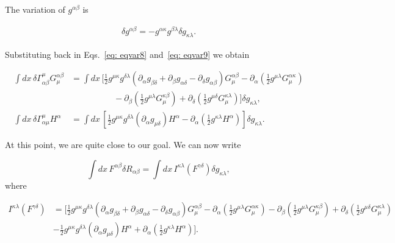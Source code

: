 \documentclass[aps,preprintnumbers,superscriptaddress,longbibliography]{revtex4-1}
\begin{document}
The variation of $g^{\alpha \beta}$ is

\begin{eqnarray}
\delta g^{\alpha \beta}=-g^{\alpha \kappa}g^{\beta \lambda}\delta g_{\kappa \lambda}.
\end{eqnarray}


Substituting back in Eqs.~\eqref{eq: eqvar8} and~\eqref{eq: eqvar9}  we obtain

\begin{align}
\int dx\, \delta \Gamma^{\mu}_{\alpha \beta}G^{\alpha \beta}_{\mu} &=\int dx\, \bigg[\frac{1}{2}g^{\mu \kappa} g^{\delta \lambda}(\partial_{\alpha}g_{\beta \delta}+\partial_{\beta}g_{\alpha \delta}-\partial_{\delta}g_{\alpha \beta})G^{\alpha \beta}_{\mu}-\partial_{\alpha}\left(\frac{1}{2} g^{\mu \lambda}G^{\alpha \kappa}_{\mu}\right) \nonumber\\
&\quad\quad\quad\quad\quad -\partial_{\beta}\left(\frac{1}{2} g^{\mu \lambda}G^{\kappa \beta}_{\mu}\right)  +\partial_{\delta}\left(\frac{1}{2} g^{\mu \delta}G^{\kappa \lambda}_{\mu}\right)\bigg] \delta g_{\kappa \lambda},\\
\int  dx\, \delta \Gamma^{\mu}_{\alpha \mu}H^{\alpha}&=\int dx\, \left[\frac{1}{2}g^{\mu \kappa} g^{\delta \lambda}(\partial_{\alpha}g_{\mu \delta})H^{\alpha}-\partial_{\alpha}\left(\frac{1}{2} g^{\kappa \lambda}H^{\alpha}\right)\right] \delta g_{\kappa \lambda}.
\end{align}


At this point, we are quite close to our goal. We can now write

\begin{equation}
\int  dx\, F^{\alpha \beta} \delta R_{\alpha \beta}= \int  dx\, I^{\kappa \lambda}(F^{\gamma \delta})\delta g_{\kappa \lambda},
\end{equation}
where

\begin{equation}
\begin{split}
I^{\kappa \lambda}(F^{\gamma \delta}) &= \bigg[\frac{1}{2}g^{\mu \kappa} g^{\delta \lambda}(\partial_{\alpha}g_{\beta \delta}+\partial_{\beta}g_{\alpha \delta}-\partial_{\delta}g_{\alpha \beta})G^{\alpha \beta}_{\mu}-\partial_{\alpha}\left(\frac{1}{2} g^{\mu \lambda}G^{\alpha \kappa}_{\mu}\right) -\partial_{\beta}\left(\frac{1}{2} g^{\mu \lambda}G^{\kappa \beta}_{\mu}\right)  +\partial_{\delta}\left(\frac{1}{2} g^{\mu \delta}G^{\kappa \lambda}_{\mu}\right)\\
& -\frac{1}{2}g^{\mu \kappa} g^{\delta \lambda}(\partial_{\alpha}g_{\mu \delta})H^{\alpha}+\partial_{\alpha}\left(\frac{1}{2} g^{\kappa \lambda}H^{\alpha}\right)\bigg].
\end{split}
\end{equation}
\end{document}
